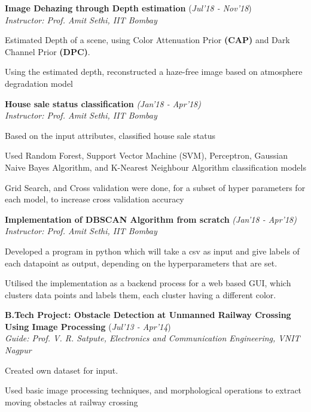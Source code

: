 \documentclass[10pt]{article}
\newcommand{\guide}[1]{\textit{\textit{\textcolor{llb}{#1}}}}
\begin{document}
\begin{myitemize}
		\item \textbf{Image Dehazing through Depth estimation}
		\hfill{(\textit{Jul'18 - Nov'18})}\\
		\guide{Instructor: Prof. Amit Sethi, IIT Bombay}
		\begin{myitemize}
			\item Estimated Depth of a scene, using Color Attenuation Prior \textbf{(CAP)} and Dark Channel Prior \textbf{(DPC)}.
			\item Using the estimated depth, reconstructed a haze-free image based on atmosphere degradation model
		\end{myitemize}

		\item \textbf{House sale status classification}
		\hfill{\textit{(Jan'18 - Apr'18)}}\\
		\guide{Instructor: Prof. Amit Sethi, IIT Bombay}
		\begin{myitemize}
			\item Based on the input attributes, classified house sale status
			\item Used Random Forest, Support Vector Machine (SVM), Perceptron, Gaussian Naive Bayes Algorithm, and K-Nearest Neighbour Algorithm classification models
			\item Grid Search, and Cross validation were done, for a subset of hyper parameters for each model, to increase cross validation accuracy
		\end{myitemize}

		\item \textbf{Implementation of DBSCAN Algorithm from scratch}
		\hfill{\textit{(Jan'18 - Apr'18)}}\\
		\guide{Instructor: Prof. Amit Sethi, IIT Bombay}
		\begin{myitemize}
			\item Developed a program in python which will take a csv as input and give labels of each datapoint as output, depending on the hyperparameters that are set.
			\item Utilised the implementation as a backend process for a web based GUI, which clusters data points and labels them, each cluster having a different color.
		\end{myitemize}

		\item\textbf{B.Tech Project: Obstacle Detection at Unmanned Railway Crossing \\Using Image Processing}
		\hfill{(\textit{Jul'13 - Apr'14})}\\
		\guide{Guide: Prof. V. R. Satpute, Electronics and Communication Engineering, VNIT Nagpur}
		\begin{myitemize}
			\item Created own dataset for input.
			\item Used basic image processing techniques, and morphological operations to extract moving obstacles at railway crossing
		\end{myitemize}
	\end{myitemize}
\end{document}
